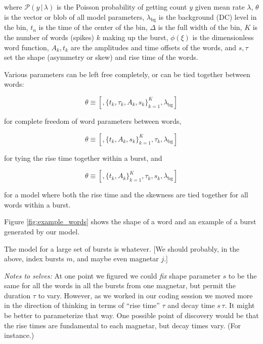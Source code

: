 \documentclass[12pt]{emulateapj}
\newcommand{\given}{\,|\,}
\newcommand{\counts}{y}
\newcommand{\pars}{\theta}
\newcommand{\mean}{\lambda}
\newcommand{\Poisson}{{\mathcal P}}
\newcommand{\bg}{\mathrm{bg}}
\begin{document}
where $\Poisson(\counts\given\mean)$ is the Poisson probability of getting count $y$ given mean rate $\mean$,
  $\pars$ is the vector or blob of all model parameters,
  $\mean_{\bg}$ is the background (DC) level in the bin,
  $t_n$ is the time of the center of the bin,
  $\Delta$ is the full width of the bin,
  $K$ is the number of words (spikes) $k$ making up the burst,
  $\phi(\xi)$ is the dimensionless word function,
  $A_k, t_k$ are the amplitudes and time offsets of the words,
  and $s, \tau$ set the shape (asymmetry or skew) and rise time of the words.
  
Various parameters can be left free completely, or can be tied together between words:
 
\begin{equation}
\theta \equiv [,\{t_k, \tau_k, A_k, s_k \}_{k=1}^K, \mean_{\bg} ]
\end{equation}

for complete freedom of word parameters between words,

\begin{equation}
\theta \equiv [,\{t_k, A_k, s_k \}_{k=1}^K,  \tau_k, \mean_{\bg} ]
\end{equation}

for tying the rise time together within a burst, and

\begin{equation}
\theta \equiv [,\{t_k, A_k\}_{k=1}^K, \tau_k, s_k , \mean_{\bg} ]\end{equation}

for a model where both the rise time and the skewness are tied together for all words within a burst.


  
Figure \ref{fig:example_words} shows the shape of a word
  and an example of a burst generated by our model.

The model for a large set of bursts is whatever.
[We should probably, in the above, index bursts $m$,
  and maybe even magnetar $j$.]

\emph{Notes to selves:}
At one point we figured we could \emph{fix} shape parameter $s$
  to be the same for all the words in all the bursts from one magnetar,
  but permit the duration $\tau$ to vary.
However, as we worked in our coding session we moved more in the direction
  of thinking in terms of ``rise time'' $\tau$ and decay time $s\,\tau$.
It might be better to parameterize that way.
One possible point of discovery would be that the rise times
  are fundamental to each magnetar,
  but decay times vary.
(For instance.)
\end{document}
